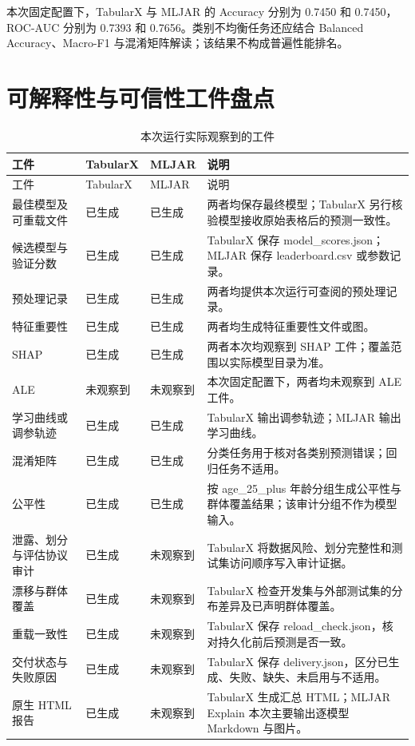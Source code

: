 \documentclass[degree=bachelor,language=chinese,fontset=fandol]{thuthesis}
\newcommand{\yes}{\textcolor{green!50!black}{已生成}}
\newcommand{\no}{\textcolor{red!70!black}{未观察到}}
\begin{document}
本次固定配置下，TabularX 与 MLJAR 的 Accuracy 分别为 0.7450 和 0.7450，ROC-AUC 分别为 0.7393 和 0.7656。类别不均衡任务还应结合 Balanced Accuracy、Macro-F1 与混淆矩阵解读；该结果不构成普遍性能排名。

\section{可解释性与可信性工件盘点}
\begin{longtable}{>{\raggedright\arraybackslash}p{}>{\centering\arraybackslash}p{}>{\centering\arraybackslash}p{}>{\raggedright\arraybackslash}p{}}
  \caption{本次运行实际观察到的工件}\label{tab:artifacts}\\
  \toprule
  工件 & TabularX & MLJAR & 说明 \\
  \midrule
  \endfirsthead
  \toprule
  工件 & TabularX & MLJAR & 说明 \\
  \midrule
  \endhead
  最佳模型及可重载文件 & \yes & \yes & 两者均保存最终模型；TabularX 另行核验模型接收原始表格后的预测一致性。 \\
  候选模型与验证分数 & \yes & \yes & TabularX 保存 model\_scores.json；MLJAR 保存 leaderboard.csv 或参数记录。 \\
  预处理记录 & \yes & \yes & 两者均提供本次运行可查阅的预处理记录。 \\
  特征重要性 & \yes & \yes & 两者均生成特征重要性文件或图。 \\
  SHAP & \yes & \yes & 两者本次均观察到 SHAP 工件；覆盖范围以实际模型目录为准。 \\
  ALE & \no & \no & 本次固定配置下，两者均未观察到 ALE 工件。 \\
  学习曲线或调参轨迹 & \yes & \yes & TabularX 输出调参轨迹；MLJAR 输出学习曲线。 \\
  混淆矩阵 & \yes & \yes & 分类任务用于核对各类别预测错误；回归任务不适用。 \\
  公平性 & \yes & \yes & 按 age\_25\_plus 年龄分组生成公平性与群体覆盖结果；该审计分组不作为模型输入。 \\
  泄露、划分与评估协议审计 & \yes & \no & TabularX 将数据风险、划分完整性和测试集访问顺序写入审计证据。 \\
  漂移与群体覆盖 & \yes & \no & TabularX 检查开发集与外部测试集的分布差异及已声明群体覆盖。 \\
  重载一致性 & \yes & \no & TabularX 保存 reload\_check.json，核对持久化前后预测是否一致。 \\
  交付状态与失败原因 & \yes & \no & TabularX 保存 delivery.json，区分已生成、失败、缺失、未启用与不适用。 \\
  原生 HTML 报告 & \yes & \no & TabularX 生成汇总 HTML；MLJAR Explain 本次主要输出逐模型 Markdown 与图片。 \\
  \bottomrule
\end{longtable}
\end{document}
